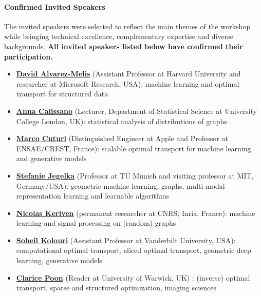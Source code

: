 \documentclass{article}
\begin{document}
\paragraph{Confirmed Invited Speakers} The invited speakers were selected to reflect the main themes of the workshop while bringing technical excellence, complementary expertise and diverse backgrounds. \textbf{All invited speakers listed below have confirmed their participation.}
\begin{itemize}[leftmargin=6mm]
  \item \href{https://dmelis.github.io/}{\textbf{David Alvarez-Melis}} (Assistant Professor at Harvard University and researcher at Microsoft Research, USA): machine learning and optimal transport for structured data
  \item \href{https://annacalissano.com/}{\textbf{Anna Calissano}} (Lecturer, Department of Statistical Science at University College London, UK): statistical analysis of distributions of graphs
  \item \href{https://marcocuturi.net/}{\textbf{Marco Cuturi}} (Distinguished Engineer at Apple and Professor at ENSAE/CREST, France): scalable optimal transport for machine learning and generative models
  \item \href{https://people.csail.mit.edu/stefje/}{\textbf{Stefanie Jegelka}} (Professor at TU Munich and visiting professor at MIT, Germany/USA): geometric machine learning, graphs, multi-modal representation learning and learnable algorithms
  \item \href{https://nkeriven.github.io/}{\textbf{Nicolas Keriven}} (permanent researcher at CNRS, Inria, France): machine learning and signal processing on (random) graphs
  \item \href{https://skolouri.github.io/}{\textbf{Soheil Kolouri}} (Assistant Professor at Vanderbilt University, USA): computational optimal transport, sliced optimal transport, geometric deep learning, generative models
  \item \href{https://cmhsp2.github.io/}{\textbf{Clarice Poon}} (Reader at University of Warwick, UK) : (inverse) optimal transport, sparse and structured optimization, imaging sciences
\end{itemize}
\end{document}
